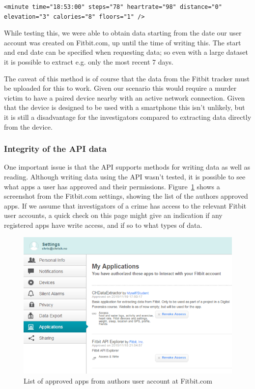 \documentclass[a4paper,11pt,dvips]{article}
\begin{document}
\scriptsize
\begin{verbatim}
<minute time="18:53:00" steps="78" heartrate="98" distance="0" elevation="3" calories="8" floors="1" />
\end{verbatim}
\normalsize

While testing this, we were able to obtain data starting from the date our user account was created on Fitbit.com, up until the time of writing this. The start and end date can be specified when requesting data; so even with a large dataset it is possible to extract e.g. only the most recent 7 days.

The caveat of this method is of course that the data from the Fitbit tracker must be uploaded for this to work. Given our scenario this would require a murder victim to have a paired device nearby with an active network connection. Given that the device is designed to be used with a smartphone this isn't unlikely, but it is still a disadvantage for the investigators compared to extracting data directly from the device.

\subsubsection{Integrity of the API data}
One important issue is that the API supports methods for writing data as well as reading. Although writing data using the API wasn't tested, it is possible to see what apps a user has approved and their permissions. Figure~\ref{fig:apisettings} shows a screenshot from the Fitbit.com settings, showing the list of the authors approved apps. If we assume that investigators of a crime has access to the relevant Fitbit user accounts, a quick check on this page might give an indication if any registered apps have write access, and if so to what types of data.

\begin{figure}
\noindent
\includegraphics[natwidth=624bp,natheight=409bp,width=\linewidth]{apisettings}
\caption{List of approved apps from authors user account at Fitbit.com}
\label{fig:apisettings}
\end{figure}
\end{document}
